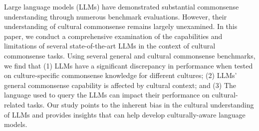 Large language models (LLMs) have demonstrated substantial commonsense understanding through numerous benchmark evaluations. However, their understanding of cultural commonsense remains largely unexamined. In this paper, we conduct a comprehensive examination of the capabilities and limitations of several state-of-the-art LLMs in the context of cultural commonsense tasks. Using several general and cultural commonsense benchmarks, we find that (1) LLMs have a significant discrepancy in performance when tested on culture-specific commonsense knowledge for different cultures; (2) LLMs' general commonsense capability is affected by cultural context; and (3) The language used to query the LLMs can impact their performance on cultural-related tasks. Our study points to the inherent bias in the cultural understanding of LLMs and provides insights that can help develop culturally-aware language models.